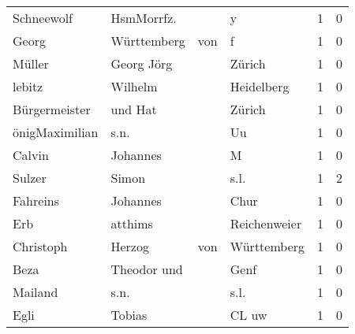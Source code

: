 \begin{center}
\begin{tiny}
\begin{longtabu}{llllrr}
               Schneewolf &                         HsmMorrfz. &             &                                           y &          1 &         0 \\
                    Georg &                        Württemberg &         von &                                           f &          1 &         0 \\
                   Müller &                         Georg Jörg &             &                                      Zürich &          1 &         0 \\
                   lebitz &                            Wilhelm &             &                                  Heidelberg &          1 &         0 \\
            Bürgermeister &                            und Hat &             &                                      Zürich &          1 &         0 \\
           önigMaximilian &                               s.n. &             &                                          Uu &          1 &         0 \\
                   Calvin &                           Johannes &             &                                           M &          1 &         0 \\
                   Sulzer &                              Simon &             &                                        s.l. &          1 &         2 \\
                 Fahreins &                           Johannes &             &                                        Chur &          1 &         0 \\
                      Erb &                            atthims &             &                                Reichenweier &          1 &         0 \\
                Christoph &                             Herzog &         von &                                 Württemberg &          1 &         0 \\
                     Beza &                        Theodor und &             &                                        Genf &          1 &         0 \\
                  Mailand &                               s.n. &             &                                        s.l. &          1 &         0 \\
                     Egli &                             Tobias &             &                                       CL uw &          1 &         0 \\

\end{longtabu}
\end{tiny}
\end{center}
